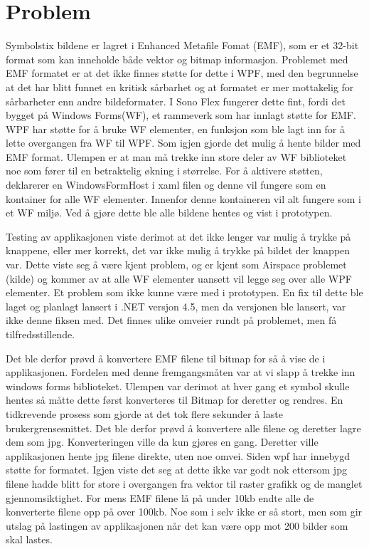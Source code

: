 { 
 
 
\section{Problem} 
 
 
Symbolstix bildene er lagret i Enhanced Metafile Fomat (EMF), som er et 32-bit format som kan inneholde både vektor og bitmap informasjon\cite{AboutEMF}. Problemet med EMF formatet er at det ikke finnes støtte for dette i WPF, med den begrunnelse at det har blitt funnet en kritisk sårbarhet\cite{EMFVulnerability} og at formatet er mer mottakelig for sårbarheter\cite{EMFForum} enn andre bildeformater. I Sono Flex fungerer dette fint, fordi det bygget på Windows Forms(WF),  et rammeverk som har innlagt støtte for EMF. WPF har støtte for å bruke WF elementer,  en funksjon som ble lagt inn for å lette overgangen fra WF til WPF. Som igjen gjorde det mulig å hente bilder med EMF format. Ulempen er at man må trekke inn store deler av WF biblioteket noe som fører til en betraktelig økning i størrelse. For å aktivere støtten, deklarerer en WindowsFormHost i xaml filen og denne vil fungere som en kontainer for alle WF elementer. Innenfor denne kontaineren vil alt fungere som i et WF miljø. Ved å gjøre dette ble alle bildene hentes og vist i prototypen.  
 
 
Testing av applikasjonen viste derimot at det ikke lenger var mulig å trykke på knappene, eller mer korrekt, det var ikke mulig å trykke på  bildet der knappen var. Dette viste seg å være kjent problem, og er kjent som Airspace problemet (kilde) og kommer av at alle WF elementer uansett vil legge seg over alle WPF elementer. Et problem som ikke kunne være med i prototypen. En fix til dette ble laget og planlagt lansert i .NET versjon 4.5, men da versjonen ble lansert, var ikke denne fiksen med. Det finnes ulike omveier rundt på problemet, men få tilfredsstillende.  
 
 
Det ble derfor prøvd å konvertere EMF filene til bitmap for så å vise de i applikasjonen. Fordelen med denne fremgangsmåten var at vi slapp å trekke inn windows forms biblioteket. Ulempen var derimot at hver gang et symbol skulle hentes så måtte dette først konverteres til Bitmap for deretter og rendres. En tidkrevende prosess som gjorde at det tok flere sekunder å laste brukergrensesnittet. Det ble derfor prøvd å konvertere alle filene og deretter lagre dem som jpg. Konverteringen ville da kun gjøres en gang. Deretter ville applikasjonen hente jpg filene direkte, uten noe omvei. Siden wpf har innebygd støtte for formatet. Igjen viste det seg at dette ikke var godt nok ettersom jpg filene hadde blitt for store i overgangen fra vektor til raster grafikk og de manglet gjennomsiktighet. For mens EMF filene lå på under 10kb endte alle de konverterte filene opp på over 100kb. Noe som i selv ikke er så stort, men som gir utslag på lastingen av applikasjonen når det kan være opp mot 200 bilder som skal lastes. 
 
}
